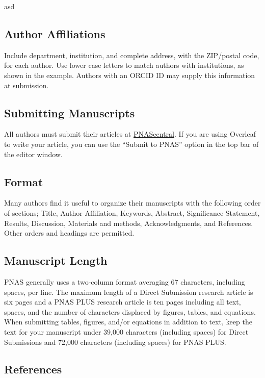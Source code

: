 \documentclass[9pt,twocolumn,twoside]{pnas-new}
\begin{document}
asd
\subsection*{Author Affiliations}

Include department, institution, and complete address, with the ZIP/postal code, for each author. Use lower case letters to match authors with institutions, as shown in the example. Authors with an ORCID ID may supply this information at submission.

\subsection*{Submitting Manuscripts}

All authors must submit their articles at \href{http://www.pnascentral.org/cgi-bin/main.plex}{PNAScentral}. If you are using Overleaf to write your article, you can use the ``Submit to PNAS'' option in the top bar of the editor window. 

\subsection*{Format}

Many authors find it useful to organize their manuscripts with the following order of sections;  Title, Author Affiliation, Keywords, Abstract, Significance Statement, Results, Discussion, Materials and methods, Acknowledgments, and References. Other orders and headings are permitted.

\subsection*{Manuscript Length}

PNAS generally uses a two-column format averaging 67 characters, including spaces, per line. The maximum length of a Direct Submission research article is six pages and a PNAS PLUS research article is ten pages including all text, spaces, and the number of characters displaced by figures, tables, and equations.  When submitting tables, figures, and/or equations in addition to text, keep the text for your manuscript under 39,000 characters (including spaces) for Direct Submissions and 72,000 characters (including spaces) for PNAS PLUS.

\subsection*{References}
\end{document}
